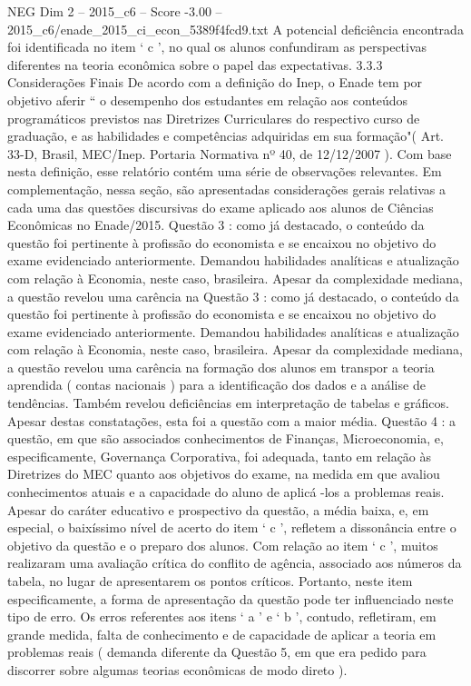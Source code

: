 \begin{textsample}{NEG Dim 2 – 2015\_c6 – Score -3.00 – 2015\_c6/enade\_2015\_ci\_econ\_5389f4fcd9.txt}
A potencial deficiência encontrada foi identificada no item ‘ c ’, no qual os alunos confundiram as perspectivas diferentes na teoria econômica sobre o papel das expectativas. 3.3.3 Considerações Finais De acordo com a definição do Inep, o Enade tem por objetivo aferir “ o desempenho dos estudantes em relação aos conteúdos programáticos previstos nas Diretrizes Curriculares do respectivo curso de graduação, e as habilidades e competências adquiridas em sua formação"( Art. 33-D, Brasil, MEC/Inep.
Portaria Normativa nº 40, de 12/12/2007 ).
Com base nesta definição, esse relatório contém uma série de observações relevantes.
Em complementação, nessa seção, são apresentadas considerações gerais relativas a cada uma das questões discursivas do exame aplicado aos alunos de Ciências Econômicas no Enade/2015.
Questão 3 : como já destacado, o conteúdo da questão foi pertinente à profissão do economista e se encaixou no objetivo do exame evidenciado anteriormente.
Demandou habilidades analíticas e atualização com relação à Economia, neste caso, brasileira.
Apesar da complexidade mediana, a questão revelou uma carência na Questão 3 : como já destacado, o conteúdo da questão foi pertinente à profissão do economista e se encaixou no objetivo do exame evidenciado anteriormente.
Demandou habilidades analíticas e atualização com relação à Economia, neste caso, brasileira.
Apesar da complexidade mediana, a questão revelou uma carência na formação dos alunos em transpor a teoria aprendida ( contas nacionais ) para a identificação dos dados e a análise de tendências.
Também revelou deficiências em interpretação de tabelas e gráficos.
Apesar destas constatações, esta foi a questão com a maior média.
Questão 4 : a questão, em que são associados conhecimentos de Finanças, Microeconomia, e, especificamente, Governança Corporativa, foi adequada, tanto em relação às Diretrizes do MEC quanto aos objetivos do exame, na medida em que avaliou conhecimentos atuais e a capacidade do aluno de aplicá -los a problemas reais.
Apesar do caráter educativo e prospectivo da questão, a média baixa, e, em especial, o baixíssimo nível de acerto do item ‘ c ’, refletem a dissonância entre o objetivo da questão e o preparo dos alunos.
Com relação ao item ‘ c ’, muitos realizaram uma avaliação crítica do conflito de agência, associado aos números da tabela, no lugar de apresentarem os pontos críticos.
Portanto, neste item especificamente, a forma de apresentação da questão pode ter influenciado neste tipo de erro.
Os erros referentes aos itens ‘ a ’ e ‘ b ’, contudo, refletiram, em grande medida, falta de conhecimento e de capacidade de aplicar a teoria em problemas reais ( demanda diferente da Questão 5, em que era pedido para discorrer sobre algumas teorias econômicas de modo direto ).

\end{textsample}
